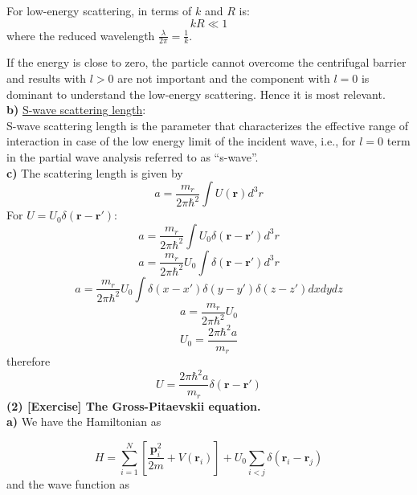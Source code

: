 \documentclass{article}
\begin{document}
For low-energy scattering, in terms of $k$ and $R$ is:
\[
k R \ll 1
\]
where the reduced wavelength $\frac{\lambda}{2\pi}=\frac{1}{k}$.


If the energy is close to zero, the particle cannot overcome the centrifugal barrier and results with $l>0$ are not important and the component with $l=0$ is dominant to understand the low-energy scattering. Hence it is most relevant.
\vspace{1cm}\\
\textbf{b)} \underline{S-wave scattering length}:
\vspace{0.5cm}\\
S-wave scattering length is the parameter that characterizes the effective range of interaction in case of the low energy limit of the incident wave, i.e., for $l = 0$ term in the partial wave analysis referred to as “s-wave”.
\vspace{1cm}\\
\textbf{c)} The scattering length is given by\\
\[
a=\frac{m_r}{2\pi\hbar^2}\int U(\mathbf{r})d^3r
\]
For $U=U_0\delta(\mathbf{r}-\mathbf{r}')$:\\
\[
a=\frac{m_r}{2\pi\hbar^2}\int U_0\delta(\mathbf{r}-\mathbf{r}')d^3r
\]
\[
a=\frac{m_r}{2\pi\hbar^2}U_0\int \delta(\mathbf{r}-\mathbf{r}')d^3r
\]
\[
a=\frac{m_r}{2\pi\hbar^2}U_0\int \delta(x-x')\delta(y-y')\delta(z-z')dxdydz
\]
\[
a=\frac{m_r}{2\pi\hbar^2}U_0
\]
\[
U_0=\frac{2\pi\hbar^2a}{m_r}
\]
therefore
\[
U=\frac{2\pi\hbar^2a}{m_r}\delta(\mathbf{r}-\mathbf{r}')
\]
\textbf{(2) [Exercise] The Gross-Pitaevskii equation.}\\

\textbf{a)} We have the Hamiltonian as


\[
H=\sum_{i=1}^N[\frac{\mathbf{p}_i^2}{2m}+V(\mathbf{r}_i)]+U_0\sum_{i<j}\delta(\mathbf{r}_i-\mathbf{r}_j)
\]
and the wave function as
\end{document}

